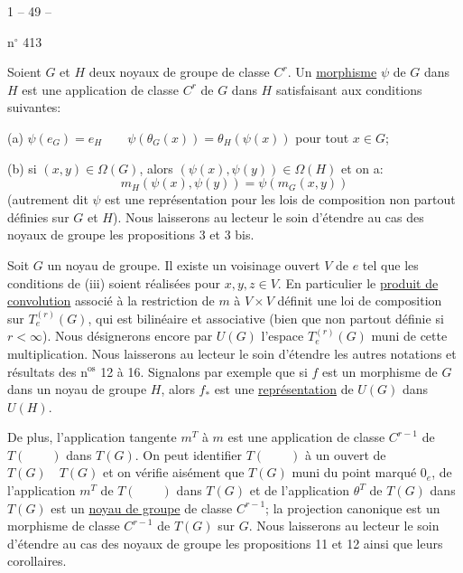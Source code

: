 \begin{center}1 -- 49 --\end{center}\hfill n$^\circ$ 413

Soient $G$ et $H$ deux noyaux de groupe de classe $C^r$.
Un \uline{morphisme} $\psi$ de $G$ dans $H$ est une application de classe $C^r$ de $G$ dans $H$ satisfaisant aux conditions suivantes:

(a) $\psi(e_G)=e_H\qquad\psi(\theta_G(x))=\theta_H(\psi(x))$ pour tout $x\in G$;

(b) si $(x,y)\in\Omega(G)$, alors $(\psi(x),\psi(y))\in\Omega(H)$ et on a:
\[
m_H(\psi(x),\psi(y))=\psi(m_G(x,y))
\]
(autrement dit $\psi$ est une représentation pour les lois de composition non partout définies sur $G$ et $H$).
Nous laisserons au lecteur le soin d'étendre au cas des noyaux de groupe les propositions 3 et 3 bis.

Soit $G$ un noyau de groupe.
Il existe un voisinage ouvert $V$ de $e$ tel que les conditions de (iii) soient réalisées pour $x,y,z\in V$.
En particulier le \uline{produit de convolution} associé à la restriction de $m$ à $V\times V$ définit une loi de composition sur $T_e^{(r)}(G)$, qui est bilinéaire et associative (bien que non partout définie si $r<\infty$).
Nous désignerons encore par $U(G)$ l'espace $T_e^{(r)}(G)$ muni de cette multiplication.
Nous laisserons au lecteur le soin d'étendre les autres notations et résultats des n$^{\mathrm{os}}$ 12 à 16.
Signalons par exemple que si $f$ est un morphisme de $G$ dans un noyau de groupe $H$, alors $f_*$ est une \uline{représentation} de $U(G)$ dans $U(H)$.

De plus, l'application tangente $m^T$ à $m$ est une application de classe $C^{r-1}$ de $T(\qquad)$ dans $T(G)$.
On peut identifier $T(\qquad)$ à un ouvert de $T(G)\quad T(G)$ et on vérifie aisément que $T(G)$ muni du point marqué $0_e$, de l'application $m^T$ de $T(\qquad)$ dans $T(G)$ et de l'application $\theta^T$ de $T(G)$ dans $T(G)$ est un \uline{noyau de groupe} de classe $C^{r-1}$; la projection canonique est un morphisme de classe $C^{r-1}$ de $T(G)$ sur $G$.
Nous laisserons au lecteur le soin d'étendre au cas des noyaux de groupe les propositions 11 et 12 ainsi que leurs corollaires.

